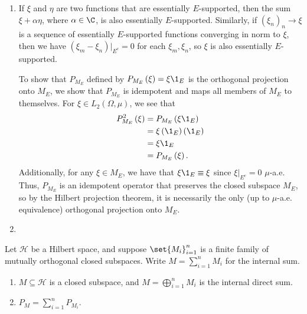 \documentclass[10pt]{mypackage}
\begin{document}
\begin{solution}\hfill
  \begin{enumerate}[(1)]
    \item If $\xi$ and $\eta$ are two functions that are essentially $E$-supported, then the sum $\xi + \alpha \eta$, where $\alpha\in \C$, is also essentially $E$-supported. Similarly, if $\left(\xi_n\right)_n\rightarrow \xi$ is a sequence of essentially $E$-supported functions converging in norm to $\xi$, then we have $\left(\xi_m - \xi_{n}\right)|_{E^{c}} = 0$ for each $\xi_{m},\xi_{n}$, so $\xi$ is also essentially $E$-supported.\newline

      To show that $P_{M_E}$ defined by $P_{M_E}\left(\xi\right) = \xi \1_{E}$ is the orthogonal projection onto $M_{E}$, we show that $P_{M_E}$ is idempotent and maps all members of $M_{E}$ to themselves. For $\xi\in L_{2}\left(\Omega,\mu\right)$, we see that
      \begin{align*}
        P_{M_E}^2\left(\xi\right) &= P_{M_E}\left(\xi \1_{E}\right)\\
                                  &= \xi\left(\1_{E}\right)\left(\1_{E}\right)\\
                                  &= \xi \1_{E}\\
                                  &= P_{M_E}\left(\xi\right).
      \end{align*}
      Additionally, for any $\xi\in M_{E}$, we have that $\xi \1_{E} \equiv \xi$ since $\xi|_{E^c} = 0$ $\mu$-a.e. Thus, $P_{M_E}$ is an idempotent operator that preserves the closed subspace $M_{E}$, so by the Hilbert projection theorem, it is necessarily the only (up to $\mu$-a.e. equivalence) orthogonal projection onto $M_{E}$.
    \item 
  \end{enumerate}
\end{solution}
\begin{proposition}
  Let $\mathcal{H}$ be a Hilbert space, and suppose $\set{M_i}_{i=1}^{n}$ is a finite family of mutually orthogonal closed subspaces. Write $M = \sum_{i=1}^{n}M_i$ for the internal sum.
  \begin{enumerate}[(1)]
    \item $M\subseteq \mathcal{H}$ is a closed subspace, and $M = \bigoplus_{i=1}^{n}M_i$ is the internal direct sum.
    \item $P_{M} = \sum_{i=1}^{n}P_{M_i}$.
  \end{enumerate}
\end{proposition}
\end{document}
